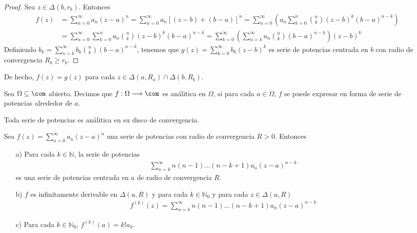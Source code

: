 \begin{proof}
Sea $z \in \Delta(b,r_b)$. Entonces
\begin{align*}
    f(z) &= \sum_{n=0}^{\infty}{a_n(z - a)^n} = \sum_{n=0}^{\infty}{a_n[(z-b) + (b-a)]^n} = \sum_{n = 0}^{\infty}\left( a_n \sum_{k=0}^{n} \binom{n}{k}(z-b)^k(b-a)^{n-k}\right) \\
    &= \sum_{n=0}^{\infty} \sum_{k=0}^{n} {a_n\binom{n}{k}(z-b)^k(b-a)^{n-k}} = \sum_{k=0}^{\infty} \left( \sum_{n=k}^{\infty} {a_n\binom{n}{k}(b-a)^{n-k}}\right)(z-b)^k
\end{align*}
Definiendo $b_k = \sum_{n=k}^{\infty} {b_k\binom{n}{k}(b-a)^{n-k}}$, tenemos que $g(z) = \sum_{k=0}^{\infty}{b_k(z-b)^k}$ es serie de potencias centrada en $b$ con radio de convergencia $R_b \ge r_b$.
\end{proof}

\begin{cor}
De hecho, $f(z) = g(z)$ para cada $z \in \Delta(a,R_a) \cap \Delta(b,R_b)$.
\end{cor}

\begin{defi}
Sea $\Omega \subseteq \com$ abierto. Decimos que $f: \Omega \longrightarrow \com$ es análitica en $\Omega$, si para cada $a \in \Omega$, $f$ se puede expresar en forma de serie de potencias alrededor de $a$.
\end{defi}

\begin{obs}
Toda serie de potencias es análitica en su disco de convergencia.
\end{obs}

\begin{teo}
Sea $f(z) = \sum_{n=0}^{\infty}{a_n(z-a)^n}$ una serie de potencias con radio de convergencia $R > 0$. Entonces
\begin{enumerate}
    \item[a)] Para cada $k \in \mathbb{N}$, la serie de potencias
    \begin{align*}
        \sum_{n=k}^{\infty}{n(n-1)...(n-k+1)a_n(z-a)^{n-k}}
    \end{align*}
    es una serie de potencias centrada en $a$ de radio de convergencia $R$.
    \item[b)] $f$ es infinitamente derivable en $\Delta(a,R)$ y para cada $k \in \mathbb{N}_0$ y para cada $z \in \Delta(a,R)$
    \begin{align*}
        f^{(k)}(z) = \sum_{n=k}^{\infty}{n(n-1)...(n-k+1)a_n(z-a)^{n-k}}
    \end{align*}
    \item[c)] Para cada $k \in \mathbb{N}_0$, $f^{(k)}(a) = k! a_k$.
\end{enumerate}
\end{teo}

